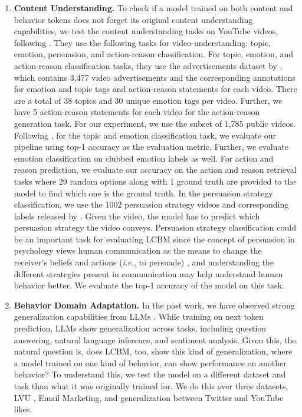 \begin{enumerate}[leftmargin=*]
    \item\textbf{Content Understanding.} To check if a model trained on both content and behavior tokens does not forget its original content understanding capabilities, we test the content understanding tasks on YouTube videos, following \cite{bhattacharyya-etal-2023-video}. They use the following tasks for video-understanding: topic, emotion, persuasion, and action-reason classification. For topic, emotion, and action-reason classification tasks, they use the advertisements dataset by \cite{hussain2017automatic}, which contains 3,477 video advertisements and the corresponding annotations for emotion and topic tags and action-reason statements for each video. There are a total of 38 topics and 30 unique emotion tags per video. Further, we have 5 action-reason statements for each video for the action-reason generation task. For our experiment, we use the subset of 1,785 public videos.  Following \cite{bhattacharyya-etal-2023-video}, for the topic and emotion classification task, we evaluate our pipeline using top-1 accuracy as the evaluation metric. Further, we evaluate emotion classification on clubbed emotion labels as well. For action and reason prediction, we evaluate our accuracy on the action and reason retrieval tasks where 29 random options along with 1 ground truth are provided to the model to find which one is the ground truth.
    In the persuasion strategy classification, we use the 1002 persuasion strategy videos and corresponding labels released by \cite{bhattacharyya-etal-2023-video}. Given the video, the model has to predict which persuasion strategy the video conveys. Persuasion strategy classification could be an important task for evaluating LCBM since the concept of persuasion in psychology views human communication as the means to change the receiver's beliefs and actions (\textit{i.e.}, to persuade) \cite{kumar2023persuasion}, and understanding the different strategies present in communication may help understand human behavior better. We evaluate the top-1 accuracy of the model on this task.
    
    \item\textbf{Behavior Domain Adaptation.} In the past work, we have observed strong generalization capabilities from LLMs \cite{openai2023gpt4,ouyang2022training,raffel2020exploring}. While training on next token prediction, LLMs show generalization across tasks, including question answering, natural language inference, and sentiment analysis. Given this, the natural question is, does LCBM, too, show this kind of generalization, where a model trained on one kind of behavior, can show performance on another behavior? To understand this, we test the model on a different dataset and task than what it was originally trained for. We do this over three datasets, LVU \cite{wu2021towards}, \companyName Email Marketing\footnotemark[6], and generalization between Twitter and YouTube likes.
    

\end{enumerate}
